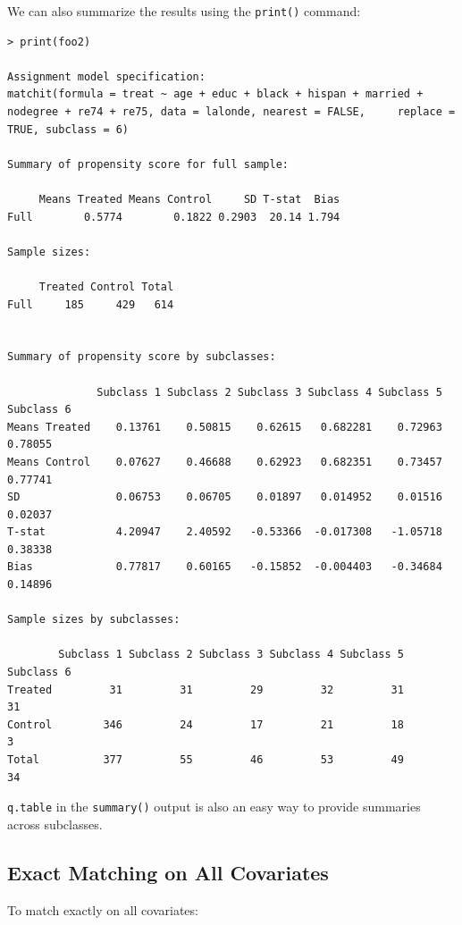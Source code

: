 \documentclass[oneside,letterpaper,titlepage]{article}
\begin{document}
We can also summarize the results using the {\tt print()} command:

\begin{verbatim}
> print(foo2)
 
Assignment model specification:
matchit(formula = treat ~ age + educ + black + hispan + married +     nodegree + re74 + re75, data = lalonde, nearest = FALSE,     replace = TRUE, subclass = 6)
 
Summary of propensity score for full sample:
 
     Means Treated Means Control     SD T-stat  Bias
Full        0.5774        0.1822 0.2903  20.14 1.794
 
Sample sizes:
 
     Treated Control Total
Full     185     429   614
 
 
Summary of propensity score by subclasses:
 
              Subclass 1 Subclass 2 Subclass 3 Subclass 4 Subclass 5 Subclass 6
Means Treated    0.13761    0.50815    0.62615   0.682281    0.72963    0.78055
Means Control    0.07627    0.46688    0.62923   0.682351    0.73457    0.77741
SD               0.06753    0.06705    0.01897   0.014952    0.01516    0.02037
T-stat           4.20947    2.40592   -0.53366  -0.017308   -1.05718    0.38338
Bias             0.77817    0.60165   -0.15852  -0.004403   -0.34684    0.14896
 
Sample sizes by subclasses:
 
        Subclass 1 Subclass 2 Subclass 3 Subclass 4 Subclass 5 Subclass 6
Treated         31         31         29         32         31         31
Control        346         24         17         21         18          3
Total          377         55         46         53         49         34
\end{verbatim}

\texttt{q.table} in the {\tt summary()} output is also an easy way to provide summaries across
subclasses.  


\subsection{Exact Matching on All Covariates}

To match exactly on all covariates:
\end{document}
